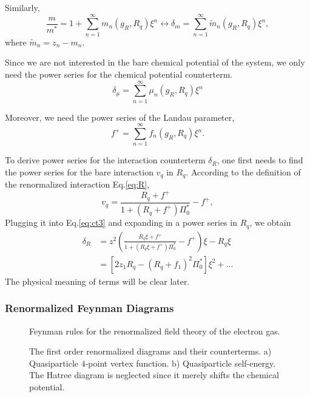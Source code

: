 \documentclass[reprint,amsmath,amssymb,aps,prb]{revtex4-1}
\begin{document}
Similarly,
\begin{equation}
    \frac{m}{m^*}=1+\sum_{n=1}^\infty m_n(g_R, R_q)\xi^n \leftrightarrow \delta_m= \sum_{n=1}^\infty \tilde{m}_n(g_R, R_q)\xi^n,
\end{equation}
where $\tilde{m}_n = z_n-m_n$.

Since we are not interested in the bare chemical potential of the system, we only need the power series for the chemical potential counterterm.
\begin{equation}
    \delta_\mu= \sum_{n=1}^\infty \mu_n(g_R, R_q)\xi^n
\end{equation}

Moreover, we need the power series of the Landau parameter,
\begin{equation}
    f^+= \sum_{n=1}^\infty f_n(g_R, R_q)\xi^n.
\end{equation}

To derive power series for the interaction counterterm $\delta_R$, one first needs to find the power series for the bare interaction $v_q$ in $R_q$.
According to the definition of the renormalized interaction Eq.\eqref{eq:R},
\begin{equation}
    v_q = \frac{R_q+f^+}{1+(R_q+f^+)\Pi_0^*}-f^+,
\end{equation}
Plugging it into Eq.\eqref{eq:ct3} and expanding in a power series in $R_q$, we obtain
\begin{align}
    \delta_R & =  z^2\left(\frac{R_q\xi+f^+}{1+(R_q\xi+f^+)\Pi_0^*}-f^+\right)\xi - R_q\xi \\
             & =           \left[2z_1 R_q-(R_q+f_1)^2\Pi_0^*\right]\xi^2+...
\end{align}
The physical meaning of terms will be clear later.

\subsubsection{Renormalized Feynman Diagrams}

\begin{figure}
    \centering
    \resizebox{0.8\linewidth}{!}{
        
    }
    \caption{Feynman rules for the renormalized field theory of the electron gas.}
    \label{fig:component}
\end{figure}

\begin{figure}
    \centering
    \begin{subfigure}{\linewidth}
        \resizebox{0.9\linewidth}{!}{
            
        }
        \caption{ }
    \end{subfigure}
    \begin{subfigure}{\linewidth}
        \resizebox{0.75\linewidth}{!}{
            
        }
        \caption{ }
    \end{subfigure}
    \caption{The first order renormalized diagrams and their counterterms.
        a) Quasiparticle $4$-point vertex function.
        b) Quasiparticle self-energy. The Hatree diagram is neglected since it merely shifts the chemical potential.}
    \label{fig:order1}
\end{figure}
\end{document}
